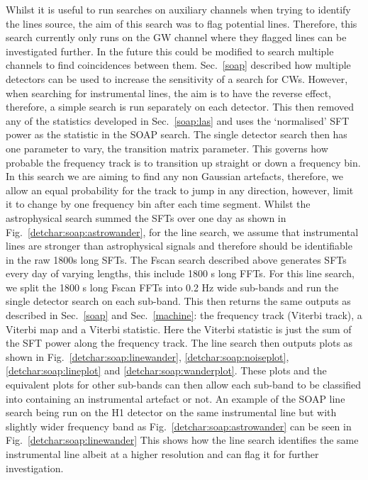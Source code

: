 Whilst it is useful to run searches on auxiliary channels when trying to identify the lines source, the aim of this search was to flag potential lines.
Therefore, this search currently only runs on the \gls{GW} channel where they flagged lines can be investigated further.
In the future this could be modified to search multiple channels to find coincidences between them. 
Sec.~\ref{soap} described how multiple detectors can be used to increase the sensitivity of a search for \glspl{CW}. 
However, when searching for instrumental lines, the aim is to have the reverse effect, therefore, a simple search is run separately on each detector. 
This then removed any of the statistics developed in Sec.~\ref{soap:las} and uses the `normalised' \gls{SFT} power as the statistic in the SOAP search.
The single detector search then has one parameter to vary, the transition matrix parameter. 
This governs how probable the frequency track is to transition up straight or down a frequency bin.
In this search we are aiming to find any non Gaussian artefacts, therefore, we allow an equal probability for the track to jump in any direction, however, limit it to change by one frequency bin after each time segment.  
Whilst the astrophysical search summed the \glspl{SFT} over one day as shown in Fig.~\ref{detchar:soap:astrowander}, for the line search, we assume that instrumental lines are stronger than astrophysical signals and therefore should be identifiable in the raw 1800s long \glspl{SFT}.
The Fscan search described above generates \glspl{SFT} every day of varying lengths, this include 1800 s long \glspl{FFT}. 
For this line search, we split the 1800 s long Fscan \glspl{FFT} into 0.2 Hz wide sub-bands and run the single detector search on each sub-band. 
This then returns the same outputs as described in Sec.~\ref{soap} and Sec.~\ref{machine}: the frequency track (Viterbi track), a Viterbi map and a Viterbi statistic. 
Here the Viterbi statistic is just the sum of the \gls{SFT} power along the frequency track. 
The line search then outputs plots as shown in Fig.~\ref{detchar:soap:linewander}, \ref{detchar:soap:noiseplot}, \ref{detchar:soap:lineplot} and \ref{detchar:soap:wanderplot}. 
These plots and the equivalent plots for other sub-bands can then allow each sub-band to be classified into containing an instrumental artefact or not.
An example of the SOAP line search being run on the H1 detector on the same instrumental line but with slightly wider frequency band as Fig.~\ref{detchar:soap:astrowander} can be seen in Fig.~\ref{detchar:soap:linewander}
This shows how the line search identifies the same instrumental line albeit at a higher resolution and can flag it for further investigation.
